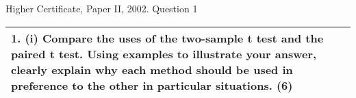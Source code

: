 \documentclass[a4paper,12pt]{article}
\begin{document}
Higher Certificate, Paper II, 2002.  Question 1 
\begin{table}[ht!]
 
\centering
 
\begin{tabular}{|p{15cm}|}
 
\hline  



1. (i) Compare the uses of the two-sample t test and the paired t test. 
 Using examples to illustrate your answer, clearly explain why each method should be used in preference to the other in particular situations. (6) 

\\ \hline
  
\end{tabular}

\end{table}
\end{document}
